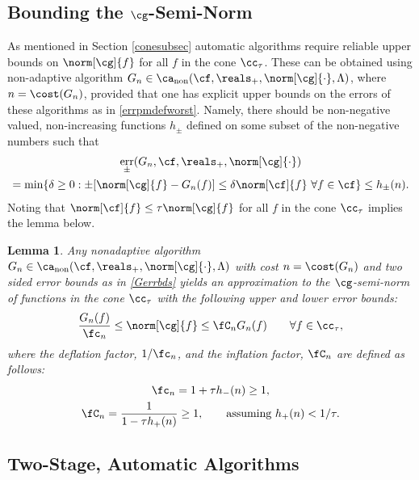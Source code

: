 \documentclass[]{elsarticle}
\DeclareMathOperator{\fix}{non}
\DeclareMathOperator{\err}{err}
\newtheorem{lem}{Lemma}
\theoremstyle{definition}
\theoremstyle{remark}
\begin{document}
\subsection{Bounding the $\cg$-Semi-Norm}

As mentioned in Section \ref{conesubsec} automatic algorithms require reliable upper bounds on $\norm[\cg]{f}$ for all $f$ in the cone $\cc_{\tau}$. These can be obtained using non-adaptive algorithm $G_n \in \ca_{\fix}(\cf,\reals_+,\norm[\cg]{\cdot},\Lambda)$, where $n=\cost(G_n)$, provided that one has explicit upper bounds on the errors of these algorithms as in \eqref{errpmdefworst}.  Namely, there should be non-negative valued, non-increasing functions $h_{\pm}$ defined on some subset of the non-negative numbers such that
\begin{multline} \label{Gerrbds}
\err_{\pm}(G_n,\cf,\reals_{+},\norm[\cg]{\cdot}) \\
= \min\{\delta \ge 0 : \pm [\norm[\cg]{f}- G_n(f)] \le \delta \norm[\cf]{f} \ \forall f \in \cf \} \le h_{ \pm}(n).
\end{multline}
Noting that $\norm[\cf]{f} \le \tau \norm[\cg]{f}$ for all $f$ in the cone $\cc_{\tau}$ implies the lemma below. 

\begin{lem} \label{Gnormlem} Any nonadaptive algorithm $G_n \in \ca_{\fix}(\cf,\reals_+,\norm[\cg]{\cdot},\Lambda)$ with cost $n=\cost(G_n)$ and two sided error bounds as in \eqref{Gerrbds} yields an approximation to the $\cg$-semi-norm of functions in the cone $\cc_{\tau}$ with the following upper and lower error bounds:
\begin{equation} \label{twosidedGineq}
\frac{G_n(f)}{\fc_n} \le \norm[\cg]{f} \le \fC_n G_n(f) \qquad \forall f \in \cc_{\tau},
\end{equation}
where the deflation factor, $1/\fc_n$, and the inflation factor, $\fC_n$ are defined as follows:
\begin{gather} \label{normdeflate}
\fc_n =1 + \tau h_{ -}(n)  \ge 1, \\
\label{norminflate}
\fC_n =\frac{1}{1 - \tau h_{ +}(n)} \ge 1, \qquad \text{assuming } h_{ +}(n) < 1/\tau.
\end{gather}
\end{lem}

\subsection{Two-Stage, Automatic Algorithms}
\end{document}
